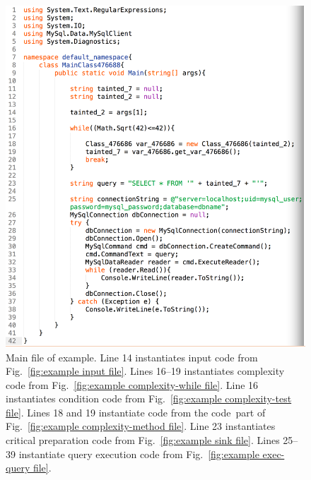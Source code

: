 \begin{figure}[htbp]
  \includegraphics[width=\linewidth]{fig_example_code1.png}
  \caption{Main file of example. Line 14 instantiates input code from 
    Fig.~\ref{fig:example input file}. Lines 16--19 instantiates complexity code from 
    Fig.~\ref{fig:example complexity-while file}. Line 16 instantiates condition code from
    Fig.~\ref{fig:example complexity-test file}.  Lines 18 and 19 instantiate code from the
    \texlangle code\texrangle\  part of Fig.~\ref{fig:example complexity-method file}.
    Line 23 instantiates critical preparation code from Fig.~\ref{fig:example sink file}.
    Lines 25--39 instantiate query execution code from Fig.~\ref{fig:example exec-query file}.
  }
  \label{fig:example main file}
\end{figure}

